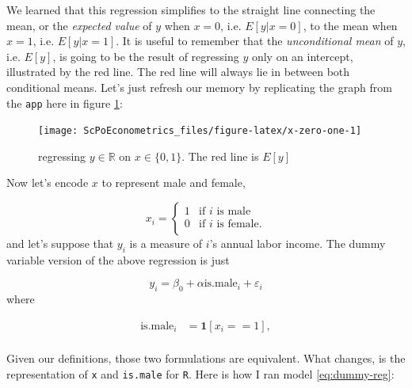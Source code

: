 \documentclass[]{book}
\newenvironment{Shaded}{\begin{snugshade}}{\end{snugshade}}
\newcommand{\KeywordTok}[1]{\textcolor[rgb]{0.13,0.29,0.53}{\textbf{#1}}}
\newcommand{\StringTok}[1]{\textcolor[rgb]{0.31,0.60,0.02}{#1}}
\newcommand{\CommentTok}[1]{\textcolor[rgb]{0.56,0.35,0.01}{\textit{#1}}}
\newcommand{\OperatorTok}[1]{\textcolor[rgb]{0.81,0.36,0.00}{\textbf{#1}}}
\newcommand{\NormalTok}[1]{#1}
\theoremstyle{definition}
\theoremstyle{definition}
\theoremstyle{definition}
\theoremstyle{remark}
\begin{document}
We learned that this regression simplifies to the straight line
connecting the mean, or the \emph{expected value} of \(y\) when \(x=0\),
i.e. \(E[y|x=0]\), to the mean when \(x=1\), i.e. \(E[y|x=1]\). It is
useful to remember that the \emph{unconditional mean} of \(y\), i.e.
\(E[y]\), is going to be the result of regressing \(y\) only on an
intercept, illustrated by the red line. The red line will always lie in
between both conditional means. Let's just refresh our memory by
replicating the graph from the \texttt{app} here in figure
\ref{fig:x-zero-one}:

\begin{figure}

{\centering \texttt{[image: ScPoEconometrics\_files/figure-latex/x-zero-one-1]} 

}

\caption{regressing $y \in \mathbb{R}$ on $x \in \{0,1\}$. The red line is $E[y]$}\label{fig:x-zero-one}
\end{figure}

Now let's encode \(x\) to represent male and female,

\[
x_i = \begin{cases}
          1 & \text{if }i\text{ is male} \\
            0 & \text{if }i\text{ is female}. \\
   \end{cases}
\] and let's suppose that \(y_i\) is a measure of \(i\)'s annual labor
income. The dummy variable version of the above regression is just

\[
y_i = \beta_0 + \alpha \text{is.male}_i + \varepsilon_i \label{eq:dummy-reg}
\] where

\begin{align*}
\text{is.male}_i &= \mathbf{1}[x_i==1], \\
\end{align*}

Given our definitions, those two formulations are equivalent. What
changes, is the representation of \texttt{x} and \texttt{is.male} for
\texttt{R}. Here is how I ran model \eqref{eq:dummy-reg}:

\begin{Shaded}
\end{Shaded}
\end{document}
